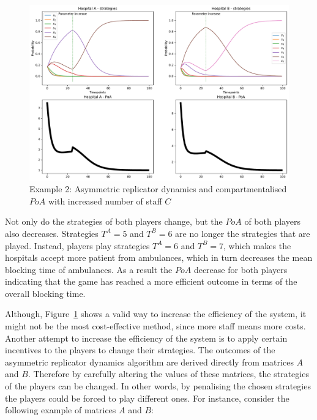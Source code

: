 \begin{figure}[H]
    \centering
    \includegraphics[width=\linewidth]{chapters/05_numerical_results/Bin/example_2/poa_ard_example_2_num_of_servers.pdf}
    \caption{Example 2: Asymmetric replicator dynamics and compartmentalised
    \(PoA\) with increased number of staff \(C\)}
    \label{fig:poa_ard_example_2_num_of_servers}
\end{figure}

Not only do the strategies of both players change, but the \(PoA\) of both
players also decreases.
Strategies \(T^A = 5\) and \(T^B = 6\) are no longer the strategies that are
played.
Instead, players play strategies \(T^A = 6\) and \(T^B = 7\), which makes the
hospitals accept more patient from ambulances, which in turn decreases the
mean blocking time of ambulances.
As a result the \(PoA\) decrease for both players indicating that the game has
reached a more efficient outcome in terms of the overall blocking time.

Although, Figure~\ref{fig:poa_ard_example_2_num_of_servers} shows a valid
way to increase the efficiency of the system, it might not be the most
cost-effective method, since more staff means more costs.
Another attempt to increase the efficiency of the system is to apply certain
incentives to the players to change their strategies.
The outcomes of the asymmetric replicator dynamics algorithm are derived
directly from matrices \(A\) and \(B\).
Therefore by carefully altering the values of these matrices, the strategies of
the players can be changed.
In other words, by penalising the chosen strategies the players could be forced
to play different ones.
For instance, consider the following example of matrices \(A\) and \(B\):

